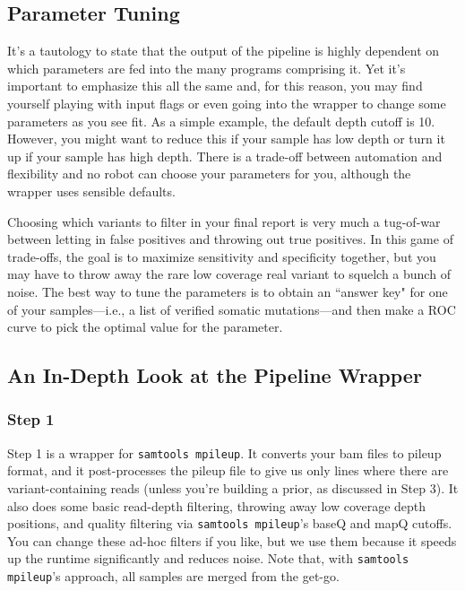 \documentclass[letterpaper,14pt]{memoir}
\begin{document}
\subsection{Parameter Tuning}\label{Parameter Tuning}

It's a tautology to state that the output of the pipeline is highly dependent on which parameters are fed into the many programs comprising it.
Yet it's important to emphasize this all the same and, for this reason, you may find yourself playing with input flags or even going into the wrapper to change some parameters as you see fit.
As a simple example, the default depth cutoff is 10.
However, you might want to reduce this if your sample has low depth or turn it up if your sample has high depth.
There is a trade-off between automation and flexibility and no robot can choose your parameters for you, although the wrapper uses sensible defaults.

Choosing which variants to filter in your final report is very much a tug-of-war between letting in false positives and throwing out true positives. In this game of trade-offs, the goal is to maximize sensitivity and specificity together, but you may have to throw away the rare low coverage real variant to squelch a bunch of noise. The best way to tune the parameters is to obtain an ``answer key" for one of your samples---i.e., a list of verified somatic mutations---and then make a ROC curve to pick the optimal value for the parameter. 

\subsection{An In-Depth Look at the Pipeline Wrapper}\label{In Depth}

\subsubsection{Step 1}

Step 1 is a wrapper for \texttt{samtools mpileup}. 
It converts your bam files to pileup format, and it post-processes the pileup file to give us only lines where there are variant-containing reads (unless you're building a prior, as discussed in Step 3).
It also does some basic read-depth filtering, throwing away low coverage depth positions, and quality filtering via \texttt{samtools mpileup}'s baseQ and mapQ cutoffs.
You can change these ad-hoc filters if you like, but we use them because it speeds up the runtime significantly and reduces noise.
Note that, with \texttt{samtools mpileup}'s approach, all samples are merged from the get-go.
\end{document}
